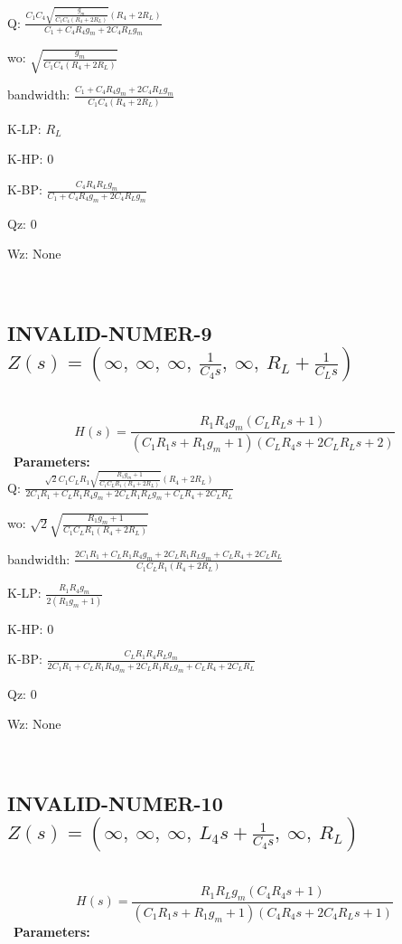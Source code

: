 \documentclass{article}
\begin{document}
Q: $\frac{C_{1} C_{4} \sqrt{\frac{g_{m}}{C_{1} C_{4} \left(R_{4} + 2 R_{L}\right)}} \left(R_{4} + 2 R_{L}\right)}{C_{1} + C_{4} R_{4} g_{m} + 2 C_{4} R_{L} g_{m}}$\ 

wo: $\sqrt{\frac{g_{m}}{C_{1} C_{4} \left(R_{4} + 2 R_{L}\right)}}$\ 

bandwidth: $\frac{C_{1} + C_{4} R_{4} g_{m} + 2 C_{4} R_{L} g_{m}}{C_{1} C_{4} \left(R_{4} + 2 R_{L}\right)}$\ 

K-LP: $R_{L}$\ 

K-HP: $0$\ 

K-BP: $\frac{C_{4} R_{4} R_{L} g_{m}}{C_{1} + C_{4} R_{4} g_{m} + 2 C_{4} R_{L} g_{m}}$\ 

Qz: $0$\ 

Wz: $\text{None}$\ 

\ 

\subsection{INVALID-NUMER-9 $Z(s) = \left( \infty, \  \infty, \  \infty, \  \frac{1}{C_{4} s}, \  \infty, \  R_{L} + \frac{1}{C_{L} s}\right)$ } \ 
\textbf{\[H(s) = \frac{R_{1} R_{4} g_{m} \left(C_{L} R_{L} s + 1\right)}{\left(C_{1} R_{1} s + R_{1} g_{m} + 1\right) \left(C_{L} R_{4} s + 2 C_{L} R_{L} s + 2\right)}\] } \ 
\textbf{Parameters:}\\ 

Q: $\frac{\sqrt{2} C_{1} C_{L} R_{1} \sqrt{\frac{R_{1} g_{m} + 1}{C_{1} C_{L} R_{1} \left(R_{4} + 2 R_{L}\right)}} \left(R_{4} + 2 R_{L}\right)}{2 C_{1} R_{1} + C_{L} R_{1} R_{4} g_{m} + 2 C_{L} R_{1} R_{L} g_{m} + C_{L} R_{4} + 2 C_{L} R_{L}}$\ 

wo: $\sqrt{2} \sqrt{\frac{R_{1} g_{m} + 1}{C_{1} C_{L} R_{1} \left(R_{4} + 2 R_{L}\right)}}$\ 

bandwidth: $\frac{2 C_{1} R_{1} + C_{L} R_{1} R_{4} g_{m} + 2 C_{L} R_{1} R_{L} g_{m} + C_{L} R_{4} + 2 C_{L} R_{L}}{C_{1} C_{L} R_{1} \left(R_{4} + 2 R_{L}\right)}$\ 

K-LP: $\frac{R_{1} R_{4} g_{m}}{2 \left(R_{1} g_{m} + 1\right)}$\ 

K-HP: $0$\ 

K-BP: $\frac{C_{L} R_{1} R_{4} R_{L} g_{m}}{2 C_{1} R_{1} + C_{L} R_{1} R_{4} g_{m} + 2 C_{L} R_{1} R_{L} g_{m} + C_{L} R_{4} + 2 C_{L} R_{L}}$\ 

Qz: $0$\ 

Wz: $\text{None}$\ 

\ 

\subsection{INVALID-NUMER-10 $Z(s) = \left( \infty, \  \infty, \  \infty, \  L_{4} s + \frac{1}{C_{4} s}, \  \infty, \  R_{L}\right)$ } \ 
\textbf{\[H(s) = \frac{R_{1} R_{L} g_{m} \left(C_{4} R_{4} s + 1\right)}{\left(C_{1} R_{1} s + R_{1} g_{m} + 1\right) \left(C_{4} R_{4} s + 2 C_{4} R_{L} s + 1\right)}\] } \ 
\textbf{Parameters:}\\ 
\end{document}
